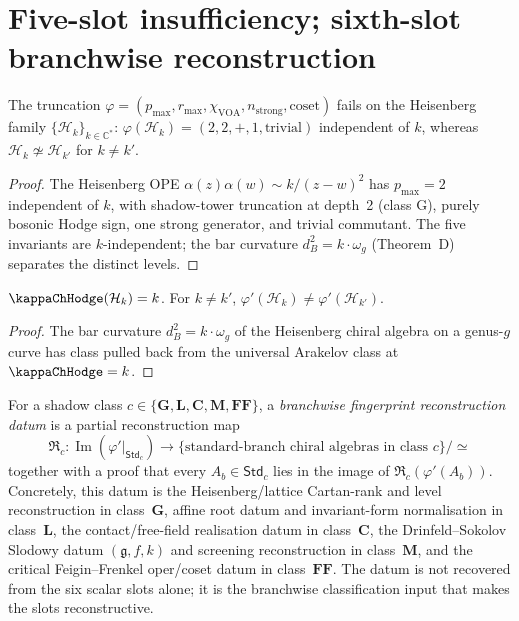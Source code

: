 \section{Five-slot insufficiency; sixth-slot branchwise reconstruction}
\label{sec:six-slot-completeness}

\begin{proposition}
\label{prop:five-slot-insufficient-ch}
The truncation $\varphi = (p_{\max}, r_{\max}, \chi_{\mathrm{VOA}},
n_{\mathrm{strong}}, \mathrm{coset})$ fails on the Heisenberg family
$\{\mathcal{H}_k\}_{k \in \mathbb{C}^*}$:
$\varphi(\mathcal{H}_k) = (2, 2, +, 1, \mathrm{trivial})$ independent
of $k$, whereas $\mathcal{H}_k \not\simeq \mathcal{H}_{k'}$ for
$k \ne k'$.
\end{proposition}

\begin{proof}
The Heisenberg OPE $\alpha(z) \alpha(w) \sim k / (z - w)^2$ has
$p_{\max} = 2$ independent of $k$, with shadow-tower truncation at
depth~2 (class G), purely bosonic Hodge sign, one strong generator,
and trivial commutant. The five invariants are $k$-independent; the
bar curvature $d_B^2 = k \cdot \omega_g$ (Theorem~D) separates the
distinct levels.
\end{proof}

\begin{proposition}
\label{prop:six-slot-distinguishes-ch}
$\kappaChHodge(\mathcal{H}_k) = k$. For $k \ne k'$,
$\varphi'(\mathcal{H}_k) \ne \varphi'(\mathcal{H}_{k'})$.
\end{proposition}

\begin{proof}
The bar curvature $d_B^2 = k \cdot \omega_g$ of the Heisenberg
chiral algebra on a genus-$g$ curve has class pulled back from the
universal Arakelov class at $\kappaChHodge = k$.
\end{proof}

\begin{definition}
\label{def:fingerprint-branch-reconstruction-datum}
For a shadow class \(c\in\{\mathbf G,\mathbf L,\mathbf C,\mathbf M,
\mathbf{FF}\}\), a \emph{branchwise fingerprint reconstruction datum}
is a partial reconstruction map
\[
\mathfrak R_c\colon
\operatorname{Im}(\varphi'|_{\mathsf{Std}_c})
\longrightarrow
\{\text{standard-branch chiral algebras in class }c\}/\simeq
\]
together with a proof that every \(A_b\in\mathsf{Std}_c\) lies in the
image of \(\mathfrak R_c(\varphi'(A_b))\).  Concretely, this datum is
the Heisenberg/lattice Cartan-rank and level reconstruction in
class~\(\mathbf G\), affine root datum and invariant-form
normalisation in class~\(\mathbf L\), the contact/free-field
realisation datum in class~\(\mathbf C\), the Drinfeld--Sokolov
Slodowy datum \((\mathfrak g,f,k)\) and screening reconstruction in
class~\(\mathbf M\), and the critical Feigin--Frenkel oper/coset datum
in class~\(\mathbf{FF}\).  The datum is not recovered from the six
scalar slots alone; it is the branchwise classification input that
makes the slots reconstructive.
\end{definition}

